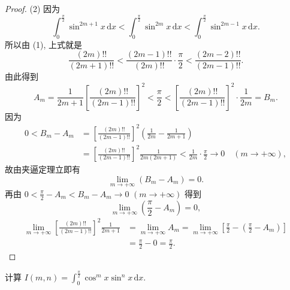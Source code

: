 \begin{proof}
(2) 因为
\[
\int_{0}^{\frac{\pi}{2}}\sin^{2m+1}x\,\mathrm{d}x<\int_{0}^{\frac{\pi}{2}}\sin^{2m}x\,\mathrm{d}x<\int_{0}^{\frac{\pi}{2}}\sin^{2m-1}x\,\mathrm{d}x.
\]
所以由 (1), 上式就是
\[
\frac{(2m)!!}{(2m+1)!!}<\frac{(2m-1)!!}{(2m)!!}\cdot\frac{\pi}{2}<\frac{(2m-2)!!}{(2m-1)!!}.
\]
由此得到
\[
A_{m}=\frac{1}{2m+1}\left[\frac{(2m)!!}{(2m-1)!!}\right]^{2}<\frac{\pi}{2}<\left[\frac{(2m)!!}{(2m-1)!!}\right]^{2}\cdot\frac{1}{2m}=B_{m}.
\]
因为
\begin{align*}
0<B_{m}-A_{m}&=\left[\frac{(2m)!!}{(2m-1)!!}\right]^{2}\left(\frac{1}{2m}-\frac{1}{2m+1}\right)\\
&=\left[\frac{(2m)!!}{(2m-1)!!}\right]^{2}\frac{1}{2m(2m+1)}<\frac{1}{2m}\cdot\frac{\pi}{2}\to0\quad(m\to+\infty),
\end{align*}
故由夹逼定理立即有
\[
\lim_{m\to+\infty}(B_{m}-A_{m})=0.
\]
再由 $0<\frac{\pi}{2}-A_{m}<B_{m}-A_{m}\to0$ $(m\to+\infty)$ 得到
\[
\lim_{m\to+\infty}\left(\frac{\pi}{2}-A_{m}\right)=0,
\]
\begin{align*}
\lim_{m\to+\infty}\left[\frac{(2m)!!}{(2m-1)!!}\right]^{2}\frac{1}{2m+1}&=\lim_{m\to+\infty}A_{m}=\lim_{m\to+\infty}\left[\frac{\pi}{2}-\left(\frac{\pi}{2}-A_{m}\right)\right]\\
&=\frac{\pi}{2}-0=\frac{\pi}{2}.
\end{align*}
\end{proof}

\begin{example}\label{ex:6.4.6}
计算 $\displaystyle I(m,n)=\int_{0}^{\frac{\pi}{2}}\cos^{m}x\sin^{n}x\,\mathrm{d}x$.
\end{example}

